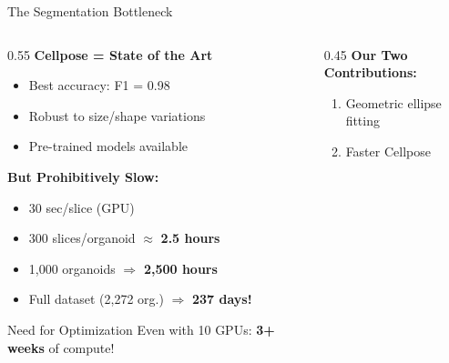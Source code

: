 \documentclass[aspectratio=169]{beamer}
\begin{document}
\begin{frame}{The Segmentation Bottleneck}
    \begin{columns}
        \begin{column}{0.55\textwidth}
            \textbf{Cellpose = State of the Art}
            \begin{itemize}
                \item Best accuracy: F1 = 0.98
                \item Robust to size/shape variations
                \item Pre-trained models available
            \end{itemize}
            
            \vspace{0.5em}
            \textbf{But Prohibitively Slow:}
            \begin{itemize}
                \item 30 sec/slice (GPU)
                \item 300 slices/organoid $\approx$ \textbf{2.5 hours}
                \item 1,000 organoids $\Rightarrow$ \textbf{2,500 hours}
                \item Full dataset (2,272 org.) $\Rightarrow$ \textbf{237 days!}
            \end{itemize}
            
            \vspace{0.5em}
            \begin{alertblock}{Need for Optimization}
                Even with 10 GPUs: \textbf{3+ weeks} of compute!
            \end{alertblock}
        \end{column}
        \begin{column}{0.45\textwidth}
            \vspace{0.3em}
            \textbf{Our Two Contributions:}
            \begin{enumerate}
                \item Geometric ellipse fitting
                \item Faster Cellpose
            \end{enumerate}
        \end{column}
    \end{columns}
\end{frame}
\end{document}
